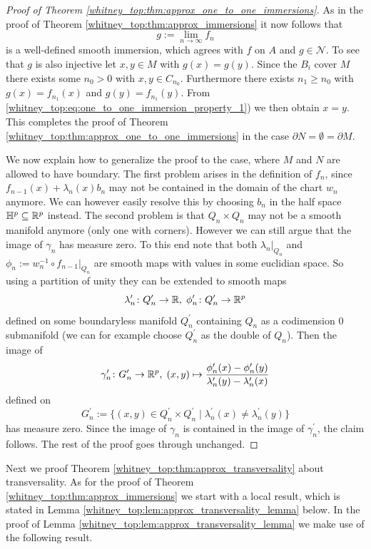 \begin{proof}[Proof of Theorem \ref{whitney_top:thm:approx_one_to_one_immersions}]
    As in the proof of Theorem \ref{whitney_top:thm:approx_immersions} it now follows that 
    \[
    g := \lim_{n \to \infty} f_n
    \]
    is a well-defined smooth immersion, which agrees with $f$ on $A$ and $g \in \mathcal{N}$. To see that $g$ is also injective let $x, y \in M$ with $g(x) = g(y)$. Since the $B_i$ cover $M$ there exists some $n_0 >0$ with $x,y \in C_{n_0}$. Furthermore there exists $n_1 \geq n_0$ with $g(x) = f_{n_1}(x)$ and $g(y) = f_{n_1}(y)$. From \ref{whitney_top:eq:one_to_one_immersion_property_1}) we then obtain $x = y$. This completes the proof of Theorem \ref{whitney_top:thm:approx_one_to_one_immersions} in the case $\partial N = \emptyset = \partial M$. 
    
    We now explain how to generalize the proof to the case, where $M$ and $N$ are allowed to have boundary. The first problem arises in the definition of $f_n$, since $f_{n-1}(x) + \lambda_n(x)b_n$ may not be contained in the domain of the chart $w_n$ anymore. We can however easily resolve this by choosing $b_n$ in the half space $\mathbb{H}^p \subseteq \mathbb{R}^p$ instead. The second problem is that $Q_n \times Q_n$ may not be a smooth manifold anymore (only one with corners). However we can still argue that the image of $\gamma_n$ has measure zero. To this end note that both $\lambda_n|_{Q_n}$ and $\phi_n := w_n^{-1} \circ f_{n-1}|_{Q_n}$ are smooth maps with values in some euclidian space. So using a partition of unity they can be extended to smooth maps 
    \[
    \lambda^\prime_n \colon Q^\prime_n \to \mathbb{R}, \; \phi^\prime_n \colon Q^\prime_n \to \mathbb{R}^p
    \]
    defined on some boundaryless manifold $Q^\prime_n$ containing $Q_n$ as a codimension $0$ submanifold (we can for example choose $Q^\prime_n$ as the double of $Q_n$). Then the image of 
    \[
    \gamma^\prime_n \colon G^\prime_n \to \mathbb{R}^p, \; (x,y) \mapsto \frac{\phi^\prime_n(x) - \phi^\prime_n(y)}{\lambda^\prime_n(y) - \lambda^\prime_n(x)}
    \]
    defined on 
    \[
    G^\prime_n := \{(x,y) \in Q^\prime_n \times Q^\prime_n \mid \lambda^\prime_n(x) \neq \lambda^\prime_n(y)\}
    \]
    has measure zero. Since the image of $\gamma_n$ is contained in the image of $\gamma^\prime_n$, the claim follows. The rest of the proof goes through unchanged.
\end{proof}

Next we proof Theorem \ref{whitney_top:thm:approx_transversality} about transversality. As for the proof of Theorem \ref{whitney_top:thm:approx_immersions} we start with a local result, which is stated in Lemma \ref{whitney_top:lem:approx_transversality_lemma} below. In the proof of Lemma \ref{whitney_top:lem:approx_transversality_lemma} we make use of the following result.

